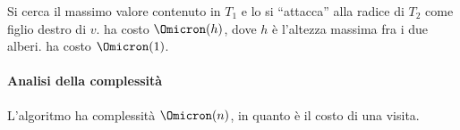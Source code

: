 

\ifstandalone

\begin{algorithm}[H]
\fi
\begin{minipage}{\linewidth}

\BlankLine
{}

\BlankLine
{}

\end{minipage}
\ifstandalone
\end{algorithm}

\fi

Si cerca il massimo valore contenuto in \(T_1\) e lo si \enquote{attacca} alla radice di \(T_2\) come figlio destro di \(v\).
\concatenateABRTrees ha costo \(\Omicron(h)\), dove \(h\) è l'altezza massima fra i due alberi.
\shortcut ha costo \(\Omicron(1)\).

\paragraph{Analisi della complessità}
L'algoritmo ha complessità \(\Omicron(n)\), in quanto è il costo di una visita.

